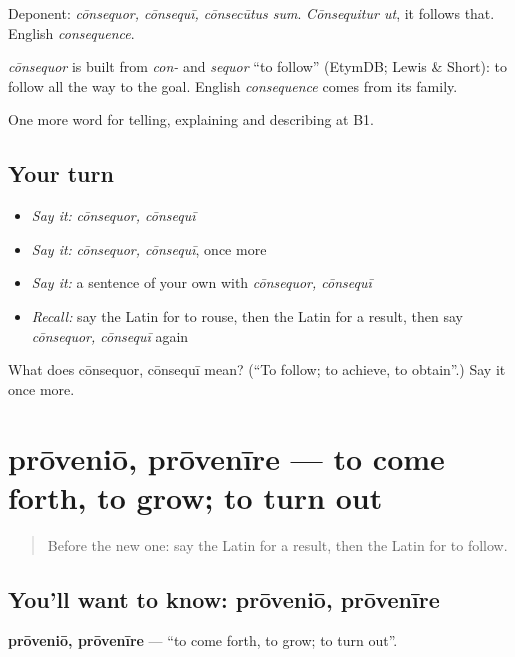 Deponent: \emph{cōnsequor, cōnsequī, cōnsecūtus sum}. \emph{Cōnsequitur ut}, it follows that. English \emph{consequence}.

\begin{cousinweb}
\emph{cōnsequor} is built from \emph{con-} and \emph{sequor} \textquotedblleft{}to follow\textquotedblright{} (EtymDB; Lewis \& Short): to follow all the way to the goal. English \emph{consequence} comes from its family.
\end{cousinweb}

\begin{grammarlens}[title={What you've built}]
One more word for telling, explaining and describing at B1.
\end{grammarlens}

\subsection*{Your turn}
\begin{itemize}
\raggedright
  \item \emph{Say it:} \emph{cōnsequor, cōnsequī}
  \item \emph{Say it:} \emph{cōnsequor, cōnsequī}, once more
  \item \emph{Say it:} a sentence of your own with \emph{cōnsequor, cōnsequī}
  \item \emph{Recall:} say the Latin for to rouse, then the Latin for a result, then say \emph{cōnsequor, cōnsequī} again
\end{itemize}

\begin{tcolorbox}[breakable,colback=teal!4,colframe=teal!35!black,title={Before you move on}]
What does cōnsequor, cōnsequī mean? (\textquotedblleft{}To follow; to achieve, to obtain\textquotedblright{}.) Say it once more.
\end{tcolorbox}
\section[prōveniō, prōvenīre]{prōveniō, prōvenīre — to come forth, to grow; to turn out}

\label{lesson:LA-C373-provenio}



\begin{quote}
Before the new one: say the Latin for a result, then the Latin for to follow.
\end{quote}

\subsection*{You'll want to know: prōveniō, prōvenīre}
\textbf{prōveniō, prōvenīre} — \textquotedblleft{}to come forth, to grow; to turn out\textquotedblright{}.

